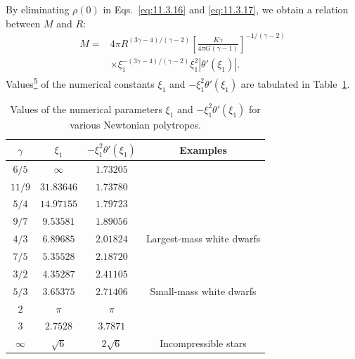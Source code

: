 By eliminating \(\rho(0)\) in Eqs.~\eqref{eq:11.3.16} and
\eqref{eq:11.3.17}, we obtain a relation between \(M\) and \(R\):
\begin{equation}
  \begin{split}
  M={}&
  4\pi R^{(3\gamma-4)/(\gamma-2)}
  \left[\frac{K\gamma}{4\pi G(\gamma-1)}\right]^{-1/(\gamma-2)}
  \\
  &\times
  \xi_1^{-(3\gamma-4)/(\gamma-2)}
  \xi_1^2\left|\theta'(\xi_1)\right|.
  \end{split}
  \tag{11.3.18}\label{eq:11.3.18}
\end{equation}
Values\hyperref[ch11-ref-5]{\textsuperscript{5}} of the numerical constants
\(\xi_1\) and \(-\xi_1^2\theta'(\xi_1)\) are tabulated in
Table~\ref{tab:11.1}.

\begingroup
\renewcommand{\thetable}{11.1}
\begin{table}[htbp]
  \centering
  \caption{Values of the numerical parameters \(\xi_1\) and
  \(-\xi_1^2\theta'(\xi_1)\) for various Newtonian polytropes.}
  \label{tab:11.1}
  \small
  \begin{tabular}{@{}cccc@{}}
    \hline
    \(\gamma\) & \(\xi_1\) & \(-\xi_1^2\theta'(\xi_1)\) & Examples\\
    \hline
    \(6/5\) & \(\infty\) & \(1.73205\) & \\
    \(11/9\) & \(31.83646\) & \(1.73780\) & \\
    \(5/4\) & \(14.97155\) & \(1.79723\) & \\
    \(9/7\) & \(9.53581\) & \(1.89056\) & \\
    \(4/3\) & \(6.89685\) & \(2.01824\) & Largest-mass white dwarfs\\
    \(7/5\) & \(5.35528\) & \(2.18720\) & \\
    \(3/2\) & \(4.35287\) & \(2.41105\) & \\
    \(5/3\) & \(3.65375\) & \(2.71406\) & Small-mass white dwarfs\\
    \(2\) & \(\pi\) & \(\pi\) & \\
    \(3\) & \(2.7528\) & \(3.7871\) & \\
    \(\infty\) & \(\sqrt6\) & \(2\sqrt6\) & Incompressible stars\\
    \hline
  \end{tabular}
\end{table}
\endgroup


